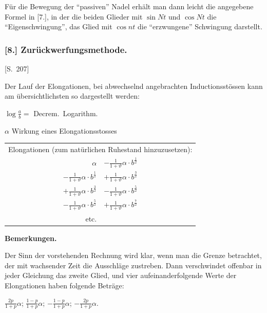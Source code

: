 \documentclass[12pt,a4paper]{article}
\begin{document}
F\"ur die Bewegung der ``passiven'' Nadel erh\"alt man dann leicht die angegebene Formel in [7.], in der die beiden Glieder mit $\sin Nt$ und $\cos Nt$ die ``Eigenschwingung'', das Glied mit $\cos nt$ die ``erzwungene'' Schwingung darstellt.


\subsubsection*{[8.] Zur\"uckwerfungsmethode.}

[S.~207]

Der Lauf der Elongationen, bei abwechselnd angebrachten Inductionsst\"ossen kann am \"ubersichtlichsten so dargestellt werden:

\begin{center}
$\log \frac{a}{b} =$ Decrem.~Logarithm.

\medskip
$\alpha$ Wirkung eines Elongationsstosses

\medskip
\begin{tabular}{rl}
\multicolumn{2}{c}{Elongationen (zum nat\"urlichen Ruhestand hinzuzusetzen):} \\
\addlinespace
$\alpha$ & $-\frac{1}{1+\vartheta}\alpha \cdot b^{\frac12}$ \\
$-\frac{1}{1+\vartheta}\alpha \cdot b^{\frac12}$ & $+\frac{1}{1+\vartheta}\alpha \cdot b^{\frac32}$ \\
$+\frac{1}{1+\vartheta}\alpha \cdot b^{\frac32}$ & $-\frac{1}{1+\vartheta}\alpha \cdot b^{\frac52}$ \\
$-\frac{1}{1+\vartheta}\alpha \cdot b^{\frac52}$ & $+\frac{1}{1+\vartheta}\alpha \cdot b^{\frac72}$ \\
etc. &
\end{tabular}
\end{center}

\medskip\noindent
\textbf{Bemerkungen.}

Der Sinn der vorstehenden Rechnung wird klar, wenn man die Grenze betrachtet, der mit wachsender Zeit die Ausschl\"age zustreben. Dann verschwindet offenbar in jeder Gleichung das zweite Glied, und vier aufeinanderfolgende Werte der Elongationen haben folgende Betr\"age:

\begin{center}
$\frac{2p}{1+p} \alpha$; \quad $\frac{1-p}{1+p} \alpha$; \quad $-\frac{1-p}{1+p} \alpha$; \quad $-\frac{2p}{1+p} \alpha$.
\end{center}
\end{document}
